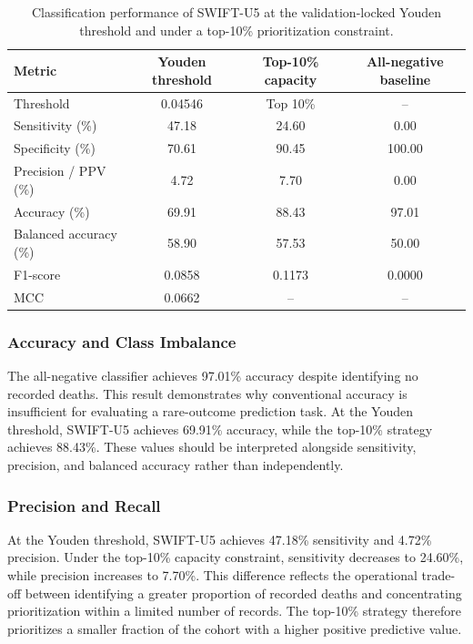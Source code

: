 \documentclass[a4paper,fleqn]{cas-sc}
\begin{document}
\begin{table}[pos=htbp]
\centering
\caption{Classification performance of SWIFT-U5 at the validation-locked Youden threshold and under a top-10\% prioritization constraint.}
\label{tab:binary_metrics}
\small
\begin{tabular}{lccc}
\toprule
\textbf{Metric} & \textbf{Youden threshold} & \textbf{Top-10\% capacity} & \textbf{All-negative baseline} \\
\midrule
Threshold & 0.04546 & Top 10\% & -- \\
Sensitivity (\%) & 47.18 & 24.60 & 0.00 \\
Specificity (\%) & 70.61 & 90.45 & 100.00 \\
Precision / PPV (\%) & 4.72 & 7.70 & 0.00 \\
Accuracy (\%) & 69.91 & 88.43 & 97.01 \\
Balanced accuracy (\%) & 58.90 & 57.53 & 50.00 \\
F1-score & 0.0858 & 0.1173 & 0.0000 \\
MCC & 0.0662 & -- & -- \\
\bottomrule
\end{tabular}
\end{table}

\subsubsection{Accuracy and Class Imbalance}

The all-negative classifier achieves 97.01\% accuracy despite identifying no recorded deaths. This result demonstrates why conventional accuracy is insufficient for evaluating a rare-outcome prediction task. At the Youden threshold, SWIFT-U5 achieves 69.91\% accuracy, while the top-10\% strategy achieves 88.43\%. These values should be interpreted alongside sensitivity, precision, and balanced accuracy rather than independently.

\subsubsection{Precision and Recall}

At the Youden threshold, SWIFT-U5 achieves 47.18\% sensitivity and 4.72\% precision. Under the top-10\% capacity constraint, sensitivity decreases to 24.60\%, while precision increases to 7.70\%. This difference reflects the operational trade-off between identifying a greater proportion of recorded deaths and concentrating prioritization within a limited number of records. The top-10\% strategy therefore prioritizes a smaller fraction of the cohort with a higher positive predictive value.
\end{document}
